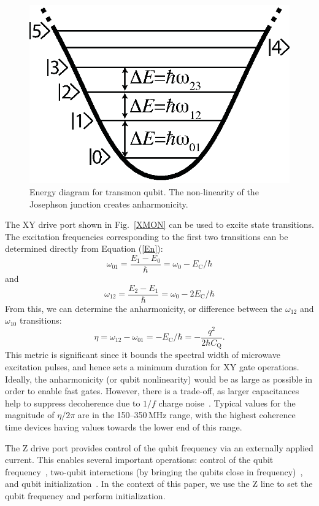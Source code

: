 \documentclass[journal]{IEEEtran}
\newcommand{\CR}[1]{{\color{black}#1}}
\begin{document}
\begin{figure}
\begin{center}
\includegraphics[width=0.6\columnwidth]{Figures/FIGURE_4}
\end{center}
\caption{Energy diagram for transmon qubit. The non-linearity of the Josephson junction creates anharmonicity.}\label{EnergyDiagram}
\end{figure}
The XY drive port shown in Fig.~\ref{XMON} can be used to excite state transitions. The excitation frequencies corresponding to the first two transitions can be determined directly from Equation (\ref{En}):
\begin{equation}
\omega_\text{01}=\frac{E_1-E_0}{\hbar}=\omega_0-E_\text{C}/\hbar
\end{equation}
and 
\begin{equation}
\omega_\text{12}=\frac{E_2-E_1}{\hbar}=\omega_0-2E_\text{C}/\hbar
\end{equation}
From this, we can determine the anharmonicity, or difference between the $\omega_\text{12}$ and $\omega_\text{10}$ transitions:
\begin{equation}
\eta=\omega_{12}-\omega_{01}=-E_\text{C}/\hbar=-\frac{q^2}{2\hbar{}C_\text{Q}}.
\end{equation}
This metric is significant since it bounds the spectral width of microwave excitation pulses, and hence sets a minimum duration for XY gate operations. 
Ideally, the anharmonicity (or qubit nonlinearity) would be as large as possible in order to enable fast gates. However, there is a trade-off, as larger capacitances help to suppress decoherence due to $1/f$ charge noise~\cite{koch2007charge}. Typical values for the magnitude of $\eta/2\pi$ are in the 150--350\,MHz range, with the highest coherence time devices having values towards the lower end of this range.


\CR{The Z drive port provides control of the qubit frequency via an externally applied current. This enables several important operations: control of the qubit frequency~\cite{majer2007coupling}, two-qubit interactions (by bringing the qubits close in frequency)~\cite{martinis2014fast}, and qubit initialization~\cite{chen2018metrology}. In the context of this paper, we use the Z line to set the qubit frequency and perform initialization. }
\end{document}
